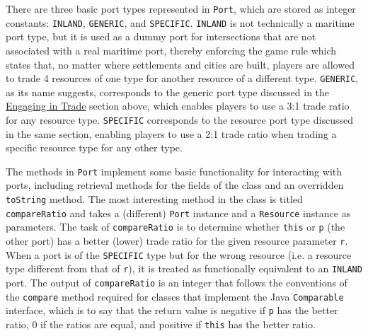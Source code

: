 \documentclass[pageno]{jpaper}
\begin{document}
\begin{doublespacing}
There are three basic port types represented in \lstinline$Port$, which are stored as integer constants: \lstinline$INLAND$, \lstinline$GENERIC$, and \lstinline$SPECIFIC$. \lstinline$INLAND$ is not technically a maritime port type, but it is used as a dummy port for intersections that are not associated with a real maritime port, thereby enforcing the game rule which states that, no matter where settlements and cities are built, players are allowed to trade 4 resources of one type for another resource of a different type. \lstinline$GENERIC$, as its name suggests, corresponds to the generic port type discussed in the \hyperlink{sec:engaging_in_trade}{Engaging in Trade} section above, which enables players to use a 3:1 trade ratio for any resource type. \lstinline$SPECIFIC$ corresponds to the resource port type discussed in the same section, enabling players to use a 2:1 trade ratio when trading a specific resource type for any other type. 

The methods in \lstinline$Port$ implement some basic functionality for interacting with ports, including retrieval methods for the fields of the class and an overridden \lstinline$toString$ method. The most interesting method in the class is titled \lstinline$compareRatio$ and takes a (different) \lstinline$Port$ instance and a \lstinline$Resource$ instance as parameters. The task of \lstinline$compareRatio$ is to determine whether \lstinline$this$ or \lstinline$p$ (the other port) has a better (lower) trade ratio for the given resource parameter \lstinline$r$. When a port is of the \lstinline$SPECIFIC$ type but for the wrong resource (i.e. a resource type different from that of \lstinline$r$), it is treated as functionally equivalent to an \lstinline$INLAND$ port. The output of \lstinline$compareRatio$ is an integer that follows the conventions of the \lstinline$compare$ method required for classes that implement the Java \lstinline$Comparable$ interface, which is to say that the return value is negative if \lstinline$p$ has the better ratio, 0 if the ratios are equal, and positive if \lstinline$this$ has the better ratio.


\end{doublespacing}
\end{document}
